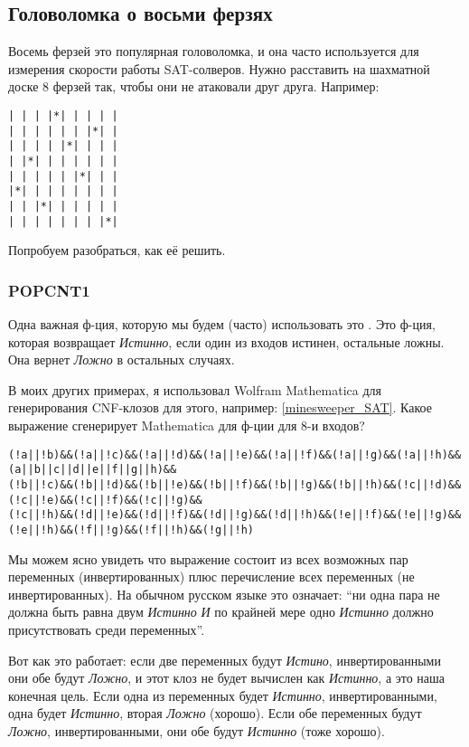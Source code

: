 \subsection{Головоломка о восьми ферзях}
\label{EightQueens}

Восемь ферзей это популярная головоломка, и она часто используется для измерения скорости работы SAT-солверов.
Нужно расставить на шахматной доске 8 ферзей так, чтобы они не атаковали друг друга.
Например:

\begin{lstlisting}
| | | |*| | | | |
| | | | | | |*| |
| | | | |*| | | |
| |*| | | | | | |
| | | | | |*| | |
|*| | | | | | | |
| | |*| | | | | |
| | | | | | | |*|
\end{lstlisting}

Попробуем разобраться, как её решить.

\subsubsection{POPCNT1}
\label{POPCNTOne}

Одна важная ф-ция, которую мы будем (часто) использовать это .
Это ф-ция, которая возвращает \textit{Истинно}, если один из входов истинен, остальные ложны.
Она вернет \textit{Ложно} в остальных случаях.

В моих других примерах, я использовал Wolfram Mathematica для генерирования CNF-клозов для этого, например: \ref{minesweeper_SAT}.
Какое выражение сгенерирует Mathematica для ф-ции  для 8-и входов?

\begin{lstlisting}
(!a||!b)&&(!a||!c)&&(!a||!d)&&(!a||!e)&&(!a||!f)&&(!a||!g)&&(!a||!h)&&(a||b||c||d||e||f||g||h)&&
(!b||!c)&&(!b||!d)&&(!b||!e)&&(!b||!f)&&(!b||!g)&&(!b||!h)&&(!c||!d)&&(!c||!e)&&(!c||!f)&&(!c||!g)&&
(!c||!h)&&(!d||!e)&&(!d||!f)&&(!d||!g)&&(!d||!h)&&(!e||!f)&&(!e||!g)&&(!e||!h)&&(!f||!g)&&(!f||!h)&&(!g||!h)
\end{lstlisting}

Мы можем ясно увидеть что выражение состоит из всех возможных пар переменных (инвертированных) плюс
перечисление всех переменных (не инвертированных).
На обычном русском языке это означает: ``ни одна пара не должна быть равна двум \textit{Истинно} \textit{И}
по крайней мере одно \textit{Истинно} должно
присутствовать среди переменных''.

Вот как это работает: если две переменных будут \textit{Истино}, инвертированными они обе будут \textit{Ложно},
и этот клоз не будет
вычислен как \textit{Истинно}, а это наша конечная цель.
Если одна из переменных будет \textit{Истинно}, инвертированными, одна будет \textit{Истинно},
вторая \textit{Ложно} (хорошо).
Если обе переменных будут \textit{Ложно}, инвертированными, они обе будут \textit{Истинно} (тоже хорошо).

